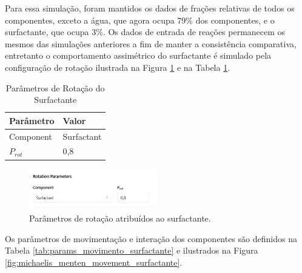 \documentclass[12pt,oneside]{report}
\begin{document}
Para essa simulação, foram mantidos os dados de frações relativas de todos os componentes, exceto a água, que agora ocupa 79\% dos componentes, e o surfactante, que ocupa 3\%. Os dados de entrada de reações permanecem os mesmos das simulações anteriores a fim de manter a consistência comparativa, entretanto o comportamento assimétrico do surfactante é simulado pela configuração de rotação ilustrada na Figura \ref{fig:rotation_surfactant} e na Tabela \ref{tab:rotation_surfactant}.

\begin{table}[H]
    \centering
    \caption{Parâmetros de Rotação do Surfactante}
    \vspace{0.2cm}
    \begin{tabularx}{\textwidth}{X m{5cm}}
        \hline
        \textbf{Parâmetro} & \textbf{Valor} \\
        \hline
        Component          & Surfactant     \\
        $P_{rot}$          & 0{,}8          \\
        \hline
    \end{tabularx}
    \vspace{0.2cm}
    \label{tab:rotation_surfactant}
\end{table}

\begin{figure}[H]
    \centering
    \includegraphics[width=0.5\textwidth]{img/rotation_surfactant.png}
    \caption{\small Parâmetros de rotação atribuídos ao surfactante.}
    \label{fig:rotation_surfactant}
\end{figure}

Os parâmetros de movimentação e interação dos componentes são definidos na Tabela \ref{tab:params_movimento_surfactante} e ilustrados na Figura \ref{fig:michaelis_menten_movement_surfactante}.
\end{document}
